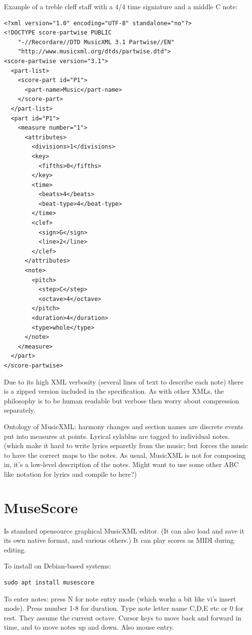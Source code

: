 \documentclass[oneside,english]{scrbook}
\begin{document}
Example of a treble cleff staff with a 4/4 time signiature and a middle C note:

\begin{verbatim}
<?xml version="1.0" encoding="UTF-8" standalone="no"?>
<!DOCTYPE score-partwise PUBLIC
    "-//Recordare//DTD MusicXML 3.1 Partwise//EN"
    "http://www.musicxml.org/dtds/partwise.dtd">
<score-partwise version="3.1">
  <part-list>
    <score-part id="P1">
      <part-name>Music</part-name>
    </score-part>
  </part-list>
  <part id="P1">
    <measure number="1">
      <attributes>
        <divisions>1</divisions>
        <key>
          <fifths>0</fifths>
        </key>
        <time>
          <beats>4</beats>
          <beat-type>4</beat-type>
        </time>
        <clef>
          <sign>G</sign>
          <line>2</line>
        </clef>
      </attributes>
      <note>
        <pitch>
          <step>C</step>
          <octave>4</octave>
        </pitch>
        <duration>4</duration>
        <type>whole</type>
      </note>
    </measure>
  </part>
</score-partwise>
\end{verbatim}

Due to its high XML verbosity (several lines of text to describe each note) there is a zipped version included in the specification. As with other XMLs, the philosophy is to be human readable but verbose then worry about compression separately.

Ontology of MusicXML: harmony changes and section names are discrete events put into measures at points.  Lyrical sylablus are tagged to individual notes. (which make it hard to write lyrics separetly from the music; but forces the music to have the correct maps to the notes.  As usual, MusicXML is not for composing in, it's a low-level description of the notes. Might want to use some other ABC like notation for lyrics and compile to here?)

\section{MuseScore}
Is standard opensource graphical MusicXML editor. (It can also load and save it its own native format, and various others.)  It can play scores as MIDI during editing. 

To install on Debian-based systems:
\begin{verbatim}
sudo apt install musescore
\end{verbatim}

To enter notes: press N for note entry mode (which works a bit like vi's insert mode). Press number 1-8 for duration. Type note letter name C,D,E etc or 0 for rest. They assume the current octave.  Cursor keys to move back and forward in time, and to move notes up and down. Also mouse entry.
\end{document}
